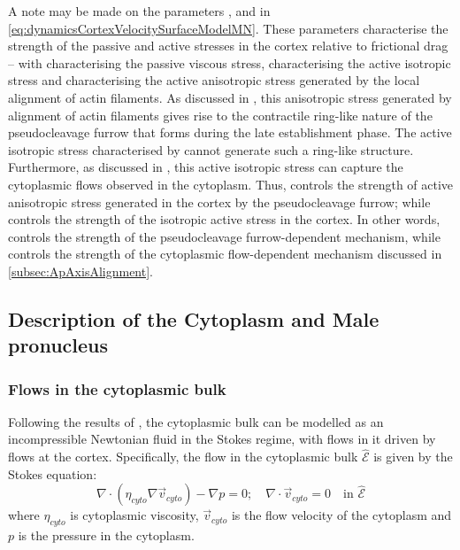 A note may be made on the parameters \hydrodynamicLength, \activeRelaxLength and \nematicLength in \autoref{eq:dynamicsCortexVelocitySurfaceModelMN}. These parameters characterise the strength of the passive and active stresses in the cortex relative to frictional drag -- with \hydrodynamicLength characterising the passive viscous stress, \activeRelaxLength characterising the active isotropic stress and \nematicLength characterising the active anisotropic stress generated by the local alignment of actin filaments. As discussed in \cite{reymann2016cortical}, this anisotropic stress generated by alignment of actin filaments gives rise to the contractile ring-like nature of the pseudocleavage furrow that forms during the late establishment phase. The active isotropic stress characterised by \activeRelaxLength cannot generate such a ring-like structure. Furthermore, as discussed in \cite{niwayama2011hydrodynamic}, this active isotropic stress can capture the cytoplasmic flows observed in the cytoplasm. Thus, \nematicLength controls the strength of active anisotropic stress generated in the cortex by the pseudocleavage furrow; while \activeRelaxLength controls the strength of the isotropic active stress in the cortex. In other words, \nematicLength controls the strength of the pseudocleavage furrow-dependent mechanism, while \activeRelaxLength controls the strength of the cytoplasmic flow-dependent mechanism discussed in \autoref{subsec:ApAxisAlignment}.

\subsection{Description of the Cytoplasm and Male pronucleus}\label{subsec:cytoplasmPronucleusModelMN}

\subsubsection{Flows in the cytoplasmic bulk}
Following the results of \cite{niwayama2011hydrodynamic}, the cytoplasmic bulk can be modelled as an incompressible Newtonian fluid in the Stokes regime, with flows in it driven by flows at the cortex. Specifically, the flow in the cytoplasmic bulk $\hat{\mathcal{E}}$ is given by the Stokes equation:
\begin{equation}\label{eq:stokesModelMN}
    \nabla\cdot\left(\eta_{cyto}\nabla\vec{v}_{cyto}\right) - \nabla p = 0; \quad \nabla\cdot\vec{v}_{cyto} = 0 \quad \textrm{in }\hat{\mathcal{E}}
\end{equation}
where $\eta_{cyto}$ is cytoplasmic viscosity, $\vec{v}_{cyto}$ is the flow velocity of the cytoplasm and $p$ is the pressure in the cytoplasm. 


